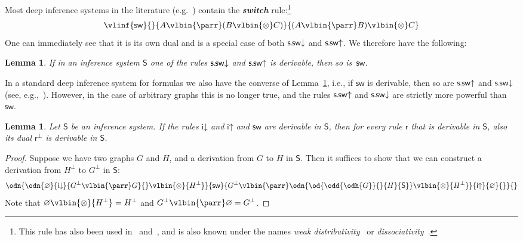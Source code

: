 \documentclass{lmcs} %
\def\sysS{\mathsf{S}}
\renewcommand{\emptyset}{\varnothing}
\def\unit{\emptyset}
\def\defn#1{\emph{\bfseries\boldmath #1}}
\def\idr{\dirule}
\def\iur{\uirule}
\def\ssdr{\dssrule}
\def\ssur{\ussrule}
\def\rr{\mathsf{r}}
\def\ods#1#2#3#4{\od{\odd{\odh{#1}}{#2}{#3}{#4}}}
\def\cneg#1{{#1^\bot}}
\def\lpar{\vlbin{\parr}}
\def\ltens{\vlbin{\otimes}}
\def\irule{\mathsf{i}}
\def\dirule{\irule\mathord{\downarrow}}
\def\uirule{\irule\mathord{\uparrow}}
\def\swir{\mathsf{sw}}
\def\ssrule{\mathsf{s\mkern-1mu.\mkern-1mu sw}}
\def\ussrule{\ssrule\mathord{\uparrow}}
\def\dssrule{\ssrule\mathord{\downarrow}}
\def\gG{G}
\def\gH{H}
\theoremstyle{plain}
\newtheorem{lemma}[thm]{Lemma}
\begin{document}
Most deep inference systems in the literature (e.g.~\cite{gug:str:01,brunnler:tiu:01,gug:SIS,str:02,gug:str:02,ross:MAV1}) contain the \defn{switch} rule:\footnote{This rule has also been used in~\cite{retore:99} and~\cite{retore:03}, and is also known under the names \emph{weak distributivity}~\cite{blute:etal:96} or \emph{dissociativity}~\cite{dosen:petric:coherence-book}.}
\begin{equation}
  \label{eq:switch}
  \vlinf{\swir}{}{A\lpar(B\ltens C)}{(A\lpar B)\ltens C}
\end{equation}
One can immediately see that it is its own dual and is a special case of both
$\ssdr$ and $\ssur$. We therefore have the following:


\begin{lemma}\label{lem:switch}
  If in an inference system $\sysS$ one of the rules $\ssdr$ and
  $\ssur$ is derivable, then so is~$\swir$.
\end{lemma}

\begin{rem}
  In a standard deep inference system for formulas we
  also have the converse of Lemma~\ref{lem:switch}, i.e., if $\swir$
  is derivable, then so are $\ssur$ and $\ssdr$ (see,
  e.g.,~\cite{dissvonlutz}). However, in the case of
  arbitrary graphs this is no longer true, and the rules $\ssur$ and
  $\ssdr$ are strictly more powerful than~$\swir$.
\end{rem}

\begin{lemma}\label{lem:dual}
  Let $\sysS$ be an inference system. If the rules $\idr$ and
  $\iur$ and $\swir$ are derivable in $\sysS$, then for every
  rule $\rr$ that is derivable in $\sysS$, also its dual $\cneg\rr$ is
  derivable in $\sysS$.
\end{lemma}

\begin{proof}
  Suppose we have two graphs $\gG$ and $\gH$, and a derivation from
  $\gG$ to $\gH$ in $\sysS$. Then it suffices to show that we can
  construct a derivation from $\cneg\gH$ to $\cneg\gG$ in $\sysS$:
  \begin{equation*}
    \odn{\odn{\unit}
          {\idr}{\cneg\gG\lpar\gG}{}\ltens\cneg\gH}
      {\swir}
      {\cneg\gG\lpar\odn{
          \ods{\gG}{}{\gH}{\sysS}\ltens\cneg\gH}
        {\iur}{\unit}{}}
      {}
  \end{equation*}
  Note that $\unit\ltens\cneg\gH=\cneg\gH$ and $\cneg\gG\lpar\unit=\cneg\gG$.
\end{proof}
\end{document}
